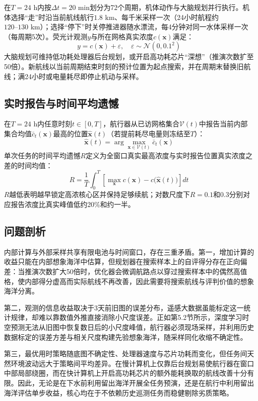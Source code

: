 在$T=24\text{ h}$内按$\Delta t = 20\text{ min}$划分为72个周期，机体动作与大脑规划并行执行\cite{xiao2020thinking, elboher2023formal}。机体选择“走”时沿当前航线航行$1.8\text{ km}$、每千米采样一次（24小时航程约$120\text{--}130\text{ km}$）；选择“停下”时关停推进器随水漂流，每4分钟对同一水体采样一次（每周期5次）。荧光计观测$y$与所在网格真实浓度$c(\mathbf{x})$满足：
\begin{equation}
  y = c(\mathbf{x}) + \varepsilon, \quad \varepsilon \sim \mathcal{N}(0, 0.1^2)
  \label{eq:obs}
\end{equation}
大脑规划可维持低功耗处理器后台规划，或开启高功耗芯片“深想”（推演次数扩至50倍）。新航线以当前周期结束时刻的预计位置为起点搜索，并在周期末替换旧航线；满24小时或电量耗尽即停止机动与采样。

\subsection{实时报告与时间平均遗憾}

在$T=24\text{ h}$内任意时刻$t \in [0, T]$，航行器从已访网格集合$\mathcal{V}(t)$中报告当前内部集合均值$\bar{c}_t(\mathbf{x})$最高的位置$\hat{\mathbf{x}}(t)$（若提前耗尽电量则冻结至$T$）：
\begin{equation}
  \hat{\mathbf{x}}(t) = \arg\max_{\mathbf{x}\in\mathcal{V}(t)} \bar{c}_t(\mathbf{x})
  \label{eq:answer}
\end{equation}
单次任务的时间平均遗憾$R$定义为全窗口真实最高浓度与实时报告位置真实浓度之差的时间均值：
\begin{equation}
  R = \frac{1}{T}\int_0^T \left[\max_{\mathbf{x}} c(\mathbf{x}) - c\big(\hat{\mathbf{x}}(t)\big)\right] dt
  \label{eq:regret}
\end{equation}
$R$越低表明越早锁定高浓核心区并保持足够续航；对数尺度下$R=0.1$和$0.3$分别对应报告浓度比真实峰值低约20\%和约一半。

\subsection{问题剖析}

内部计算与外部采样共享有限电池与时间窗口，存在三重矛盾。第一，增加计算的收益只能在内部想象海洋中估算，但规划器在搜索样本上的自评得分存在正向偏差：当推演次数扩大50倍时，优化器会微调航路点以穿过搜索样本中的偶然高值格，使内部得分虚高而实际航线不再改善\cite{smith2006curse, vanhasselt2010double}，因此需要将搜索航线与评判价值的想象海洋分离。

第二，观测的信息收益取决于3天前旧图的误差分布，遥感大数据虽能标定这一统计规律，却难以靠数值外推直接消除小尺度误差。正如第5.2节所示，深度学习时空预测无法从旧图中恢复数日后的小尺度峰值，航行器必须现场采样，并利用历史数据标定的误差方差与相关尺度构建先验想象海洋，随采样同化收缩不确定性。

第三，最优用时策略随底图不确定性、处理器速度与芯片功耗而变化，但任务间天然环境波动远大于策略间平均差异。在慢计算机上仅靠后台规划易使航行器在窗口中部局部绕圈，而在快计算机上开启高功耗芯片的额外能耗换取的航线改善十分有限。因此，无论是在下水前利用留出海洋开展全任务预演，还是在航行中利用留出海洋评估单步收益，核心均在于不依赖历史巡测任务而稳健剔除劣质策略。
